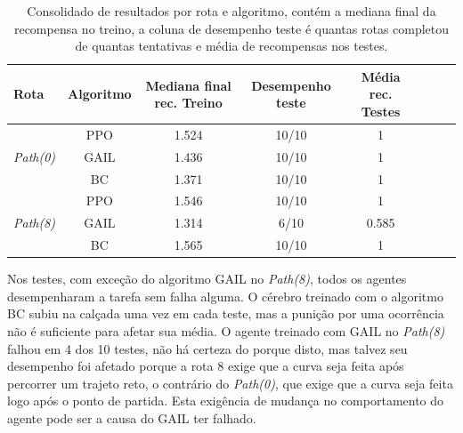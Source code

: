 \begin{table}[htpb]
    \centering
    \caption{Consolidado de resultados por rota e algoritmo, contém a mediana final da recompensa no treino, a coluna de desempenho teste é quantas rotas completou de quantas tentativas e média de recompensas nos testes.}
    \label{resultado-tabela-desafio-1}
    \begin{tabular}{|l|c|c|c|c|c|c|r|}
         \hline
         \small{Rota}                         & \small{Algoritmo}   & \small{Mediana final rec. Treino}  & \small{Desempenho teste}    & \small{Média rec. Testes}  \\ \hline
         \multirow{3}{*}{\textit{Path(0)}}    &      PPO            &   1.524                            &    10/10                     &      1                    \\ \cline{2-5}
                                              &      GAIL           &   1.436                            &    10/10                     &      1                    \\ \cline{2-5}
                                              &      BC             &   1.371                            &    10/10                     &      1                    \\ \hline
         \multirow{3}{*}{\textit{Path(8)}}    &      PPO            &   1.546                            &    10/10                     &      1                    \\ \cline{2-5}
                                              &      GAIL           &   1.314                            &    6/10                      &      0.585                \\ \cline{2-5}
                                              &      BC             &   1.565                            &    10/10                     &      1                    \\ \hline
    \end{tabular}
\end{table}


Nos testes, com exceção do algoritmo GAIL no \textit{Path(8)}, todos os agentes desempenharam a tarefa sem falha alguma. O  cérebro treinado com o algoritmo BC subiu na calçada uma vez em cada teste, mas a punição por uma ocorrência não é suficiente para afetar sua média. O agente treinado com GAIL no \textit{Path(8)} falhou em 4 dos 10 testes, não há certeza do porque disto, mas talvez seu desempenho foi afetado porque a rota 8 exige que a curva seja feita após percorrer um trajeto reto, o contrário do \textit{Path(0)}, que exige que a curva seja feita logo após o ponto de partida. Esta exigência de mudança no comportamento do agente pode ser a causa do GAIL ter falhado.

